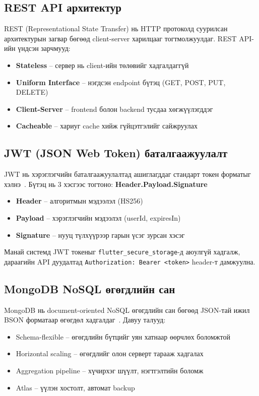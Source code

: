 \subsection{REST API архитектур}

REST (Representational State Transfer) нь HTTP протоколд суурилсан архитектурын загвар
бөгөөд client-server харилцааг тогтмолжуулдаг. REST API-ийн үндсэн зарчмууд:
\begin{itemize}
  \item \textbf{Stateless} -- сервер нь client-ийн төлөвийг хадгалдаггүй
  \item \textbf{Uniform Interface} -- нэгдсэн endpoint бүтэц (GET, POST, PUT, DELETE)
  \item \textbf{Client-Server} -- frontend болон backend тусдаа хөгжүүлэгддэг
  \item \textbf{Cacheable} -- хариуг cache хийж гүйцэтгэлийг сайжруулах
\end{itemize}

\subsection{JWT (JSON Web Token) баталгаажуулалт}

JWT нь хэрэглэгчийн баталгаажуулалтад ашиглагддаг стандарт токен форматыг хэлнэ~\cite{jwt2015}.
Бүтэц нь 3 хэсгээс тогтоно: \textbf{Header.Payload.Signature}

\begin{itemize}
  \item \textbf{Header} -- алгоритмын мэдээлэл (HS256)
  \item \textbf{Payload} -- хэрэглэгчийн мэдээлэл (userId, expiresIn)
  \item \textbf{Signature} -- нууц түлхүүрээр гарын үсэг зурсан хэсэг
\end{itemize}

Манай системд JWT токеныг \texttt{flutter\_secure\_storage}-д аюулгүй хадгалж,
дараагийн API дуудалтад \texttt{Authorization: Bearer <token>} header-т дамжуулна.

\subsection{MongoDB NoSQL өгөгдлийн сан}

MongoDB нь document-oriented NoSQL өгөгдлийн сан бөгөөд JSON-тай ижил BSON форматаар
өгөгдөл хадгалдаг~\cite{mongodb2019}. Давуу талууд:
\begin{itemize}
  \item Schema-flexible -- өгөгдлийн бүтцийг уян хатнаар өөрчлөх боломжтой
  \item Horizontal scaling -- өгөгдлийг олон серверт тарааж хадгалах
  \item Aggregation pipeline -- хүчирхэг шүүлт, нэгтгэлтийн боломж
  \item Atlas -- үүлэн хостолт, автомат backup
\end{itemize}

